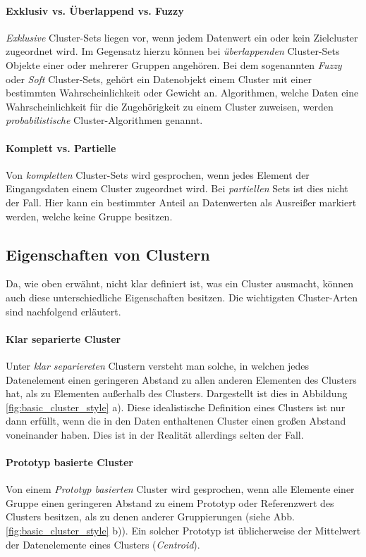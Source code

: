 \paragraph{Exklusiv vs. Überlappend vs. Fuzzy}
\textit{Exklusive} Cluster-Sets liegen vor, wenn jedem Datenwert ein oder kein Zielcluster zugeordnet wird.
Im Gegensatz hierzu können bei \textit{überlappenden} Cluster-Sets Objekte einer oder mehrerer Gruppen angehören.
Bei dem sogenannten \textit{Fuzzy} oder \textit{Soft} Cluster-Sets, gehört ein Datenobjekt einem Cluster
mit einer bestimmten Wahrscheinlichkeit oder Gewicht an. Algorithmen, welche Daten eine
Wahrscheinlichkeit für die Zugehörigkeit zu einem Cluster zuweisen, werden \textit{probabilistische}
Cluster-Algorithmen genannt.

\paragraph{Komplett vs. Partielle}
Von \textit{kompletten} Cluster-Sets wird gesprochen, wenn jedes Element der Eingangsdaten einem Cluster zugeordnet wird.
Bei \textit{partiellen} Sets ist dies nicht der Fall. Hier kann ein bestimmter Anteil an Datenwerten als Ausreißer markiert
werden, welche keine Gruppe besitzen.


\subsection{Eigenschaften von Clustern}

Da, wie oben erwähnt, nicht klar definiert ist, was ein Cluster ausmacht, können auch diese unterschiedliche Eigenschaften
besitzen. Die wichtigsten Cluster-Arten sind nachfolgend erläutert.

\paragraph{Klar separierte Cluster}
Unter \textit{klar separiereten} Clustern versteht man solche, in welchen jedes Datenelement einen geringeren
Abstand zu allen anderen Elementen des Clusters hat, als zu Elementen außerhalb des Clusters.
Dargestellt ist dies in Abbildung \ref{fig:basic_cluster_style} a). Diese idealistische Definition eines
Clusters ist nur dann erfüllt, wenn die in den Daten enthaltenen Cluster einen großen Abstand voneinander haben.
Dies ist in der Realität allerdings selten der Fall.

\paragraph{Prototyp basierte Cluster}
Von einem \textit{Prototyp basierten} Cluster wird gesprochen, wenn alle Elemente einer Gruppe einen
geringeren Abstand zu einem Prototyp oder Referenzwert des Clusters besitzen, als zu denen anderer Gruppierungen (siehe Abb. \ref{fig:basic_cluster_style} b)).
Ein solcher Prototyp ist üblicherweise der Mittelwert der Datenelemente eines Clusters (\textit{Centroid}).

